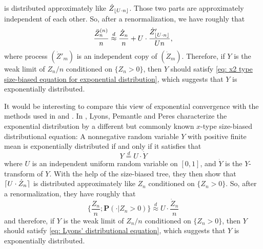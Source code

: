 \documentclass[12pt,a4paper]{amsart}
\DeclarePairedDelimiter\ceil{\lceil}{\rceil}
\DeclarePairedDelimiter\floor{\lfloor}{\rfloor}
\numberwithin{equation}{section}
\begin{document}
	is distributed approximately like $\dot Z_{ \floor{U\cdot n}}$. 
	Those two parts are approximately independent of each other.
	So, after a renormalization, we have roughly that
\begin{equation}
\label{eq: Our insight}
	\frac{\ddot Z_n^{(n)}}{n} 
	\overset{d} \approx \frac{\dot Z_n}{n} + %
			U \cdot \frac{   \dot Z'_{  \floor{ U \cdot n }  }   }    {   Un   },
\end{equation} 
	where process $(\dot Z'_m)$ is an independent copy of $(\dot Z_m)$.
	Therefore, if $Y$ is the weak limit of $Z_n/n$ conditioned on $\{Z_n > 0\}$, 
	then $Y$ should satisfy \eqref{eq: x2 type size-biased equation for exponential distribution}, which suggests that $Y$ is exponentially distributed. 
	
	It would be interesting to compare this view of exponential convergence with the methods used in \cite{geiger2000new} and \cite{lyons1995conceptual}. 
	In \cite{lyons1995conceptual}, Lyons, Pemantle and Peres characterize the exponential distribution by a different but commonly known $x$-type size-biased distributional equation: 
	A nonnegative random variable $Y$ with positive finite mean is exponentially distributed if and only if it satisfies that 
\begin{equation}
\label{eq: Lyons' distributional equation}
		Y 		\overset{d}= U \cdot \dot Y
\end{equation}
	where $U$ is an independent uniform random variable on $[0,1]$, and $\dot Y$ is the $Y$-transform of $Y$.
	With the help of the size-biased tree, they then show that $\ceil{U \cdot \dot Z_n}$ is distributed approximately like $Z_n$ conditioned on $\{Z_n > 0\}$. 
	So, after a renormalization, they have roughly that 
\begin{equation}
\label{eq: Lyons' insight}
	\big\{\frac{Z_n}{n} ; \mathbf P(  \cdot| Z_n > 0) \big\} 
	\overset{d}{\approx} U \cdot \frac{ \dot Z_n}{n}
\end{equation}
	and therefore, if $Y$ is the weak limit of $Z_n/n$ conditioned on $\{Z_n > 0\}$, 
	then $Y$ should satisfy \eqref{eq: Lyons' distributional equation}, which suggests that $Y$ is exponentially distributed. 
	
\end{document}
